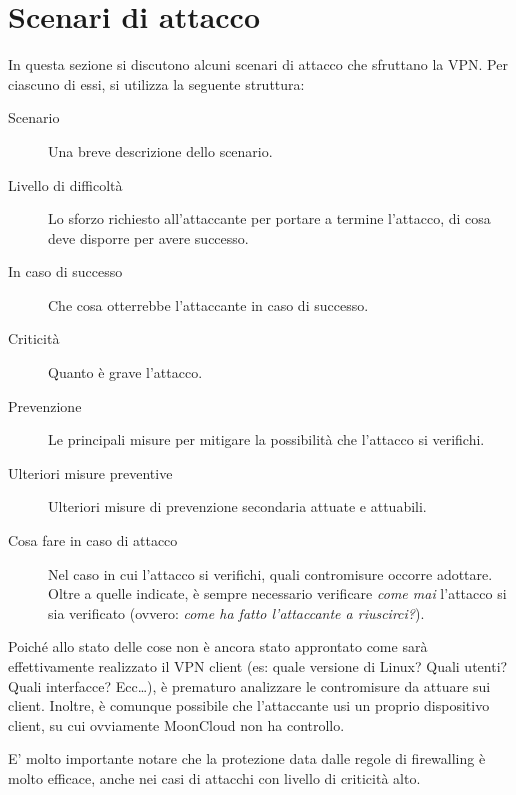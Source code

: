 \section{Scenari di attacco}\label{sec:attacks}

In questa sezione si discutono alcuni scenari di attacco
che sfruttano la VPN.
Per ciascuno di essi, si utilizza la seguente struttura:
\begin{description}
    \item[Scenario]Una breve descrizione dello scenario.
    \item[Livello di difficoltà]Lo sforzo richiesto all'attaccante
    per portare a termine l'attacco, di cosa deve disporre per avere
    successo.
    \item[In caso di successo]Che cosa otterrebbe l'attaccante
    in caso di successo.
    \item[Criticità]Quanto è grave l'attacco.
    \item[Prevenzione]Le principali misure
    per mitigare la possibilità che l'attacco si verifichi.
    \item[Ulteriori misure preventive]Ulteriori misure
    di prevenzione secondaria attuate e attuabili.
    \item[Cosa fare in caso di attacco]Nel caso in cui
    l'attacco si verifichi, quali contromisure occorre
    adottare. Oltre a quelle indicate, è sempre necessario
    verificare \textit{come mai} l'attacco si sia verificato
    (ovvero: \textit{come ha fatto l'attaccante a riuscirci?}).
\end{description}
Poiché allo stato delle cose non è ancora stato approntato come
sarà effettivamente realizzato il VPN client (es: quale versione
di Linux? Quali utenti? Quali interfacce? Ecc\ldots), è prematuro
analizzare le contromisure da attuare sui client.
Inoltre, è comunque possibile che l'attaccante usi un proprio
dispositivo client, su cui ovviamente MoonCloud non ha controllo.

E' molto importante notare che la protezione data dalle regole di
firewalling è molto efficace, anche nei casi di attacchi con livello
di criticità alto.




